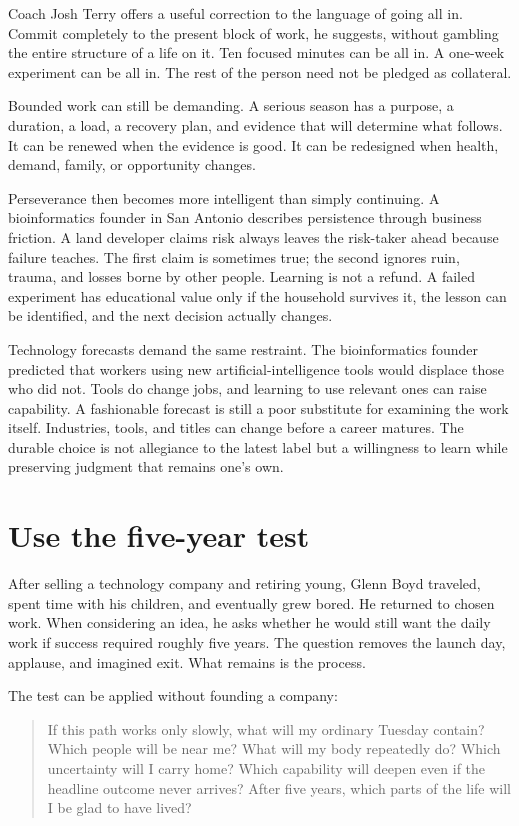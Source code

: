 Coach Josh Terry offers a useful correction to the language of going all in.
Commit completely to the present block of work, he suggests, without gambling
the entire structure of a life on it. Ten focused minutes can be all in. A
one-week experiment can be all in. The rest of the person need not be pledged
as collateral.

Bounded work can still be demanding. A serious season has a purpose, a
duration, a load, a recovery plan, and evidence
that will determine what follows. It can be renewed when the evidence is good.
It can be redesigned when health, demand, family, or opportunity changes.

Perseverance then becomes more intelligent than simply continuing. A
bioinformatics founder in San Antonio describes persistence through business
friction. A land developer claims risk always leaves the risk-taker ahead
because failure teaches. The first claim is sometimes true; the second ignores
ruin, trauma, and losses borne by other people. Learning is not a refund. A
failed experiment has educational value only if the household survives it, the
lesson can be identified, and the next decision actually changes.

Technology forecasts demand the same restraint. The bioinformatics founder
predicted that workers using new artificial-intelligence tools would displace
those who did not. Tools do change jobs, and learning to use relevant ones can
raise capability. A fashionable forecast is still a poor substitute for
examining the work itself. Industries, tools, and titles can change before a
career matures. The durable choice is not allegiance to the latest label but a
willingness to learn while preserving judgment that remains one's own.

\section{Use the five-year test}

After selling a technology company and retiring young, Glenn Boyd traveled,
spent time with his children, and eventually grew bored. He returned to chosen
work. When considering an idea, he asks whether he would still want the daily
work if success required roughly five years. The question removes the launch
day, applause, and imagined exit. What remains is the process.

The test can be applied without founding a company:

\begin{quote}
\small
If this path works only slowly, what will my ordinary Tuesday contain? Which
people will be near me? What will my body repeatedly do? Which uncertainty will
I carry home? Which capability will deepen even if the headline outcome never
arrives? After five years, which parts of the life will I be glad to have lived?
\end{quote}

